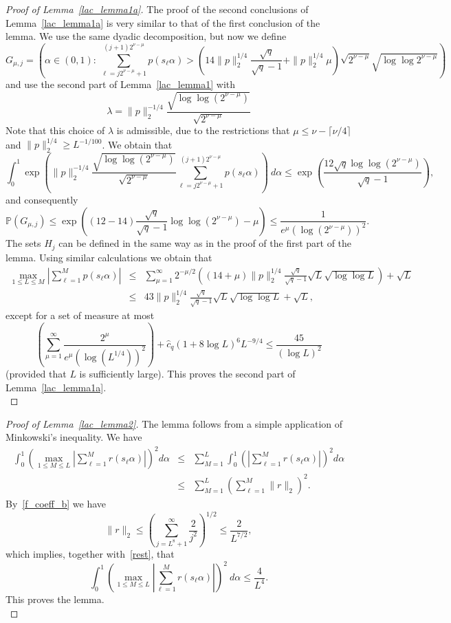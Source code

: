 \documentclass[12pt]{amsart}
\newcommand {\p} {\mathbb{P}}
\begin{document}
\begin{proof}[Proof of Lemma~\ref{lac_lemma1a}]
The proof of the second conclusions of Lemma~\ref{lac_lemma1a} is very similar to that of the first conclusion of the lemma. We use the same dyadic decomposition, but now we define 
$$
G_{\mu,j} = \left( \alpha \in (0,1):~\sum_{\ell=j 2^{\nu-\mu}+1}^{(j+1) 2^{\nu-\mu}} p(s_\ell \alpha) > \left(14 \|p\|_2^{1/4} \frac{\sqrt{q}}{\sqrt{q}-1} + \|p\|_2^{1/4} \mu \right) \sqrt{2^{\nu-\mu}} \sqrt{\log \log 2^{\nu-\mu}} \right)
$$
and use the second part of Lemma~\ref{lac_lemma1} with
$$
\lambda = \|p\|_2^{-1/4} \frac{\sqrt{\log \log (2^{\nu-\mu})}}{\sqrt{2^{\nu-\mu}}}
$$
Note that this choice of $\lambda$ is admissible, due to the restrictions that $\mu \leq \nu - \lceil \nu/4\rceil$ and $\|p\|_2^{1/4} \geq L^{-1/100}$. We obtain that
$$
\int_0^1 \exp\left(\|p\|_2^{-1/4} \frac{\sqrt{\log \log (2^{\nu-\mu})}}{\sqrt{2^{\nu-\mu}}} \sum_{\ell=j 2^{\nu-\mu}+1}^{(j+1) 2^{\nu-\mu}} p(s_\ell \alpha) \right) ~d\alpha \leq \exp \left( \frac{12 \sqrt{q}\log \log (2^{\nu-\mu})}{\sqrt{q}-1} \right),
$$
and consequently 
$$
\p (G_{\mu,j}) \leq \exp \left( \left(12 - 14 \right) \frac{\sqrt{q}}{\sqrt{q}-1} \log \log (2^{\nu-\mu}) - \mu \right) \leq \frac{1}{e^{\mu} (\log (2^{\nu-\mu}))^{2}}.
$$
The sets $H_j$ can be defined in the same way as in the proof of the first part of the lemma. Using similar calculations we obtain that
\begin{eqnarray*}
\max_{1 \leq L \leq M} \left| \sum_{\ell=1}^M p(s_\ell \alpha) \right| & \leq & \sum_{\mu=1}^\infty 2^{-\mu/2} \left(\left(14+\mu\right) \|p\|_2^{1/4} \frac{\sqrt{q}}{\sqrt{q}-1} \sqrt{L} \sqrt{\log \log L} \right) + \sqrt{L} \\
& \leq & 43 \|p\|_2^{1/4} \frac{\sqrt{q}}{\sqrt{q}-1} \sqrt{L} \sqrt{\log \log L} + \sqrt{L},
\end{eqnarray*}
except for a set of measure at most
$$
\left(\sum_{\mu=1}^\infty \frac{2^\mu}{e^\mu (\log (L^{1/4}))^2}\right) + \hat{c}_q (1 + 8 \log L)^6 L^{-9/4} \leq \frac{45}{(\log L)^2}
$$
(provided that $L$ is sufficiently large). This proves the second part of Lemma~\ref{lac_lemma1a}.\\
\end{proof}


\begin{proof}[Proof of Lemma~\ref{lac_lemma2}] 
The lemma follows from a simple application of Minkowski's inequality. We have
\begin{eqnarray}
\int_0^1 \left( \max_{1 \leq M \leq L} \left| \sum_{\ell=1}^{M} r(s_\ell \alpha) \right| \right)^2 d\alpha & \leq & \sum_{M=1}^L \int_0^1 \left(\left| \sum_{\ell=1}^{M} r(s_\ell \alpha) \right| \right)^2 d\alpha \nonumber\\
& \leq & \sum_{M=1}^L \left( \sum_{\ell=1}^M \|r\|_2  \right)^2. \label{rest}
\end{eqnarray}
By~\eqref{f_coeff_b} we have 
$$
\|r\|_2 \leq \left(\sum_{j=L^8+1}^{\infty} \frac{2}{j^2}\right)^{1/2} \leq \frac{2}{L^{7/2}},
$$
which implies, together with~\eqref{rest}, that
$$
\int_0^1 \left( \max_{1 \leq M \leq L} \left| \sum_{\ell=1}^{M} r(s_\ell \alpha) \right| \right)^2 ~d\alpha \leq \frac{4}{L^4}.
$$
This proves the lemma.\\
\end{proof}
\end{document}

